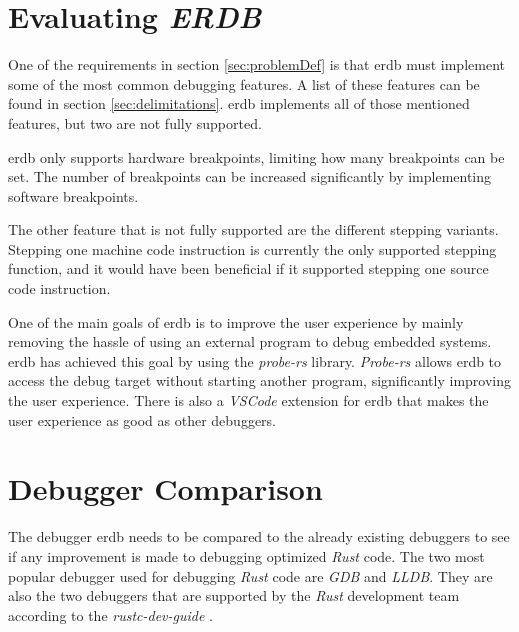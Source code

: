 \section{Evaluating \emph{ERDB}} %
One of the requirements in section \ref{sec:problemDef} is that \gls{erdb} must implement some of the most common debugging features.
A list of these features can be found in section \ref{sec:delimitations}.
\gls{erdb} implements all of those mentioned features, but two are not fully supported.


\gls{erdb} only supports hardware breakpoints, limiting how many breakpoints can be set.
The number of breakpoints can be increased significantly by implementing software breakpoints.


The other feature that is not fully supported are the different stepping variants.
Stepping one machine code instruction is currently the only supported stepping function, and it would have been beneficial if it supported stepping one source code instruction.


One of the main goals of \gls{erdb} is to improve the user experience by mainly removing the hassle of using an external program to debug embedded systems.
\gls{erdb} has achieved this goal by using the \emph{probe-rs} library.
\emph{Probe-rs} allows \gls{erdb} to access the debug target without starting another program, significantly improving the user experience.
There is also a \emph{VSCode} extension for \gls{erdb} that makes the user experience as good as other debuggers.



\section{Debugger Comparison} %
\label{sec:debuggercomparison}


The debugger \gls{erdb} needs to be compared to the already existing debuggers to see if any improvement is made to debugging optimized \emph{Rust} code.
The two most popular debugger used for debugging \emph{Rust} code are \emph{GDB} and \emph{LLDB}.
They are also the two debuggers that are supported by the \emph{Rust} development team according to the \emph{rustc-dev-guide} \cite{rust-dev-guide}.


